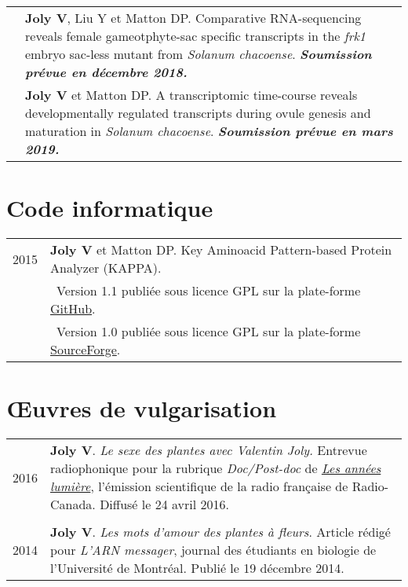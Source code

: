 \documentclass[letterpaper,12pt]{article}
\begin{document}
\begin{tabularx}{\textwidth}{@{}r|X@{}}
& \textbf{Joly V}, Liu Y et Matton DP.
  Comparative RNA-sequencing reveals female gameotphyte-sac specific transcripts in the \emph{frk1} embryo sac-less mutant from \emph{Solanum chacoense}. {\bfseries\em Soumission prévue en décembre 2018.} \vspace{3mm} \\

& \textbf{Joly V} et Matton DP.
  A transcriptomic time-course reveals developmentally regulated transcripts during ovule genesis and maturation in \emph{Solanum chacoense}. {\bfseries\em Soumission prévue en mars 2019.} \\
\end{tabularx}

\vspace{6mm}

\section[Code informatique]{Code informatique}

\begin{tabularx}{\textwidth}{@{}r|X@{}}

2015 & \textbf{Joly V} et Matton DP. Key Aminoacid Pattern-based Protein Analyzer (KAPPA). \\
& \small \hspace{1.5mm} \textbullet{}~Version 1.1 publiée sous licence GPL sur la plate-forme \href{https://github.com/valentinjoly/kappa-1.1}{GitHub}. \\
& \small \hspace{1.5mm} \textbullet{}~Version 1.0 publiée sous licence GPL sur la plate-forme \href{https://sourceforge.net/projects/kappa-sequence-search/}{SourceForge}. \\

\end{tabularx}

\vspace{6mm}

\section[Vulgarisation]{Œuvres de vulgarisation}

\begin{tabularx}{\textwidth}{@{}r|X@{}}

2016 & \textbf{Joly V}. {\em Le sexe des plantes avec Valentin Joly.} Entrevue radiophonique pour la rubrique {\em Doc/Post-doc} de \href{http://ici.radio-canada.ca/emissions/les_annees_lumiere/2015-2016/chronique.asp?idChronique=404672}{\em Les années lumière}, l’émission scientifique de la radio française de Radio-Canada. Diffusé le 24 avril 2016. \\

\multicolumn{2}{c}{} \\

2014 & \textbf{Joly V}. {\em Les mots d’amour des plantes à fleurs}. Article rédigé pour {\em L’ARN messager}, journal des étudiants en biologie de l’Université de Montréal. Publié le 19 décembre 2014. \\


\end{tabularx}
\end{document}
